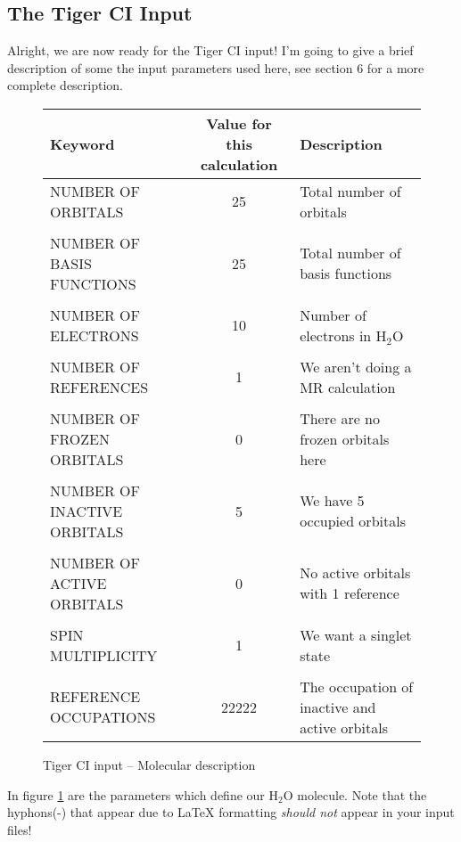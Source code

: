 \documentclass{article}
\begin{document}
\subsection{The Tiger CI Input}
Alright, we are now ready for the Tiger CI input! I'm going to give a brief description of some the input parameters used here, see section 6 for a more complete description. 


\begin{figure}[h!]
	\begin{tabular}{ p{5cm} | c | p{5cm} }
		\hline
		\textbf{Keyword} & \textbf{Value for this calculation} & \textbf{Description} \\ \hline
		NUMBER OF ORBITALS&25 & Total number of orbitals\\ 
		& &\\
		NUMBER OF BASIS FUNCTIONS&25 & Total number of basis functions\\
		& &\\ 
		NUMBER OF ELECTRONS & 10 & Number of electrons in H$_2$O \\ 
		& &\\
		NUMBER OF REFERENCES& 1  & We aren't doing a MR calculation \\
		& &\\ 
		NUMBER OF FROZEN ORBITALS&0 &There are no frozen orbitals here \\
		& &\\ 
		NUMBER OF INACTIVE ORBITALS&5 & We have 5 occupied orbitals\\ 
		& &\\
		NUMBER OF ACTIVE ORBITALS&0 & No active orbitals with 1 reference \\ 
		& &\\
		SPIN MULTIPLICITY&1 & We want a singlet state \\ 
		& &\\
		REFERENCE OCCUPATIONS& 22222 &The occupation of inactive and active orbitals \\ 
	\end{tabular}
	\centering
	\caption{Tiger CI input -- Molecular description}
	\label{tableMolDef}
\end{figure}


In figure \ref{tableMolDef} are the parameters which define our H$_2$O molecule. Note that the hyphons(-) that appear due to LaTeX formatting \emph{should not} appear in your input files!
\end{document}
